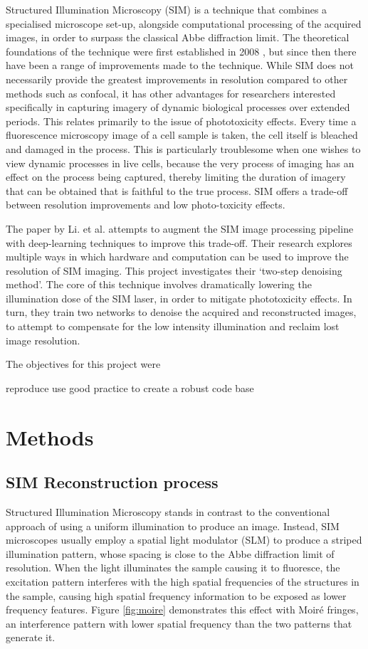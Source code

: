 \documentclass[12pt]{article}
\begin{document}
Structured Illumination Microscopy (SIM) is a technique that combines a specialised microscope set-up,
alongside computational processing of the acquired images,
in order to surpass the classical Abbe diffraction limit.
The theoretical foundations of the technique were first established in 2008 \cite{originalSIM},
but since then there have been a range of improvements made to the technique.
While SIM does not necessarily provide the greatest improvements in resolution compared to other methods such as confocal,
it has other advantages for researchers interested specifically in capturing imagery of dynamic biological processes over extended periods.
This relates primarily to the issue of phototoxicity effects.
Every time a fluorescence microscopy image of a cell sample is taken, the cell itself is bleached and damaged in the process.
This is particularly troublesome when one wishes to view dynamic processes in live cells,
because the very process of imaging has an effect on the process being captured,
thereby limiting the duration of imagery that can be obtained that is faithful to the true process.
SIM offers a trade-off between resolution improvements and low photo-toxicity effects.

The paper by Li. et al. \cite{keypaper} attempts to augment the SIM image processing pipeline with deep-learning techniques to improve this trade-off.
Their research explores multiple ways in which hardware and computation can be used to improve the resolution of SIM imaging.
This project investigates their `two-step denoising method'.
The core of this technique involves dramatically lowering the illumination dose of the SIM laser,
in order to mitigate phototoxicity effects.
In turn, they train two networks to denoise the acquired and reconstructed images,
to attempt to compensate for the low intensity illumination and reclaim lost image resolution.

The objectives for this project were

reproduce
use good practice to create a robust code base

\section{Methods}

\subsection{SIM Reconstruction process}

Structured Illumination Microscopy stands in contrast to the conventional approach of using a uniform illumination to produce an image.
Instead, SIM microscopes usually employ a spatial light modulator (SLM) to produce a striped illumination pattern,
whose spacing is close to the Abbe diffraction limit of resolution.
When the light illuminates the sample causing it to fluoresce,
the excitation pattern interferes with the high spatial frequencies of the structures in the sample,
causing high spatial frequency information to be exposed as lower frequency features.
Figure \ref{fig:moire} demonstrates this effect with Moir\'{e} fringes,
an interference pattern with lower spatial frequency than the two patterns that generate it.
\end{document}
